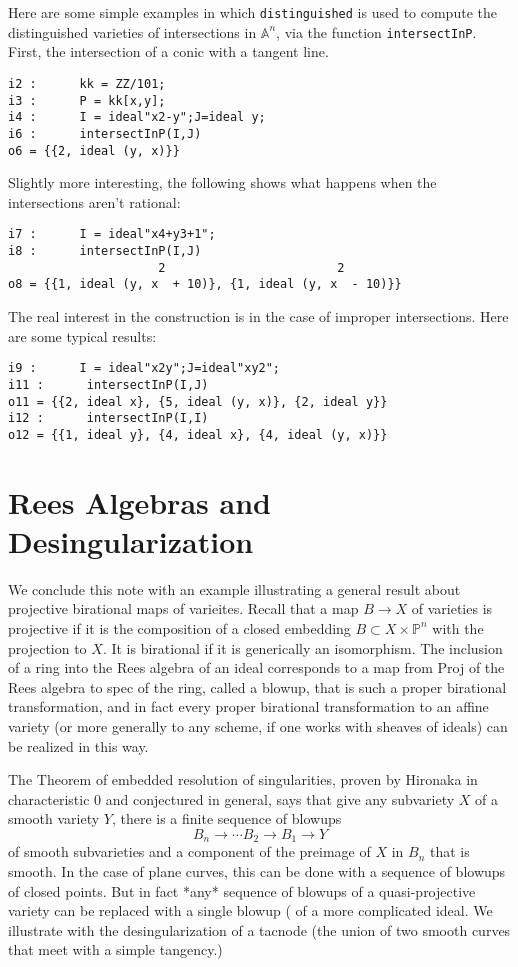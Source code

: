 \documentclass[twoside,12pt, leqno]{amsart}
\def\PP{{\mathbb P}}
\begin{document}
Here are some simple examples in which {\tt distinguished} is used to compute the distinguished varieties of
intersections in ${\mathbb A}^{n}$, via the function {\tt intersectInP}. First, the intersection of a conic with a tangent line.
\begin{verbatim}
i2 :      kk = ZZ/101;
i3 :      P = kk[x,y];
i4 :      I = ideal"x2-y";J=ideal y;
i6 :      intersectInP(I,J)
o6 = {{2, ideal (y, x)}}
\end{verbatim}
Slightly more interesting, the following shows what happens when the intersections aren't rational:
\begin{verbatim}
i7 :      I = ideal"x4+y3+1";
i8 :      intersectInP(I,J)
                     2                        2
o8 = {{1, ideal (y, x  + 10)}, {1, ideal (y, x  - 10)}}
\end{verbatim}
The real interest in the construction is in the case of improper intersections. Here are some typical results:
\begin{verbatim}
i9 :      I = ideal"x2y";J=ideal"xy2";
i11 :      intersectInP(I,J)
o11 = {{2, ideal x}, {5, ideal (y, x)}, {2, ideal y}}
i12 :      intersectInP(I,I)
o12 = {{1, ideal y}, {4, ideal x}, {4, ideal (y, x)}}
\end{verbatim}

\section{Rees Algebras and Desingularization}

We conclude this note with an example illustrating a general result about projective birational maps of varieites.
Recall that a map $B\to X$ of varieties is projective if it is the composition of a closed embedding $B\subset X\times \PP^n$ with the projection to $X$.
It is birational if it is generically an isomorphism. The inclusion of a ring into the Rees algebra
of an ideal corresponds to a map from Proj of the Rees algebra to spec of the ring, called a blowup, that is such a proper birational transformation, and in fact every proper birational transformation to an affine variety (or more generally to any scheme, if one works with sheaves of ideals) can be realized in this way.

The Theorem of embedded resolution of singularities, proven by Hironaka in characteristic 0 and conjectured in general, says that give any subvariety $X$ of a smooth variety $Y$, there is
a finite sequence of blowups 
$$
B_n \to \cdots B_2 \to B_1 \to Y
$$
of smooth subvarieties  and a component of the preimage of
$X$ in $B_n$ that is smooth. In the case of plane curves, this can be done with a sequence of blowups of closed points. But in fact *any* sequence of blowups of a quasi-projective variety can be replaced with a single blowup (\cite[Theorem II.7.17]{Hartshorne} of a more complicated ideal. We illustrate with the desingularization of a tacnode (the union of two smooth curves that meet with a simple tangency.)
\end{document}
